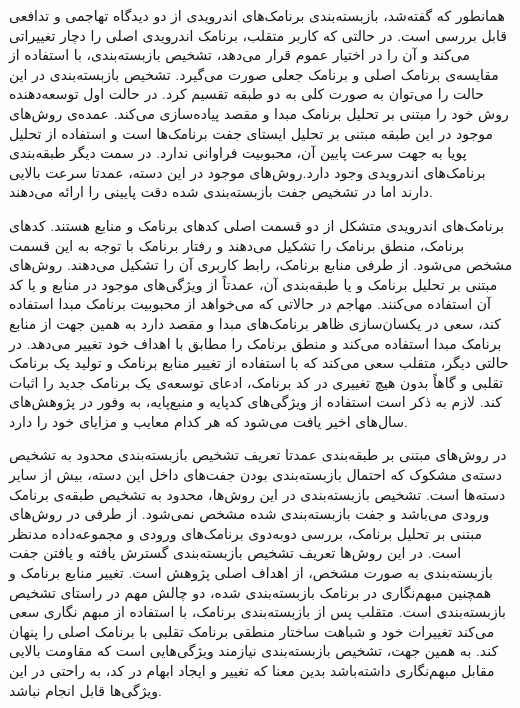 همانطور که گفته‌شد، بازبسته‌بندی برنامک‌های اندرویدی از دو دیدگاه تهاجمی و تدافعی قابل بررسی است. در حالتی که کاربر متقلب، برنامک اندرویدی اصلی را دچار تغییراتی می‌کند و آن را در اختیار عموم قرار می‌دهد،  تشخیص بازبسته‌بندی، با استفاده از مقایسه‌ی برنامک اصلی و برنامک جعلی صورت می‌گیرد. تشخیص بازبسته‌بندی در این حالت را می‌توان به صورت کلی  به دو طبقه تقسیم کرد. در حالت اول توسعه‌دهنده روش خود را مبتنی بر تحلیل برنامک مبدا و مقصد پیاده‌سازی می‌کند. عمده‌ی روش‌های موجود در این طبقه مبتنی بر تحلیل ایستا‌ی جفت‌ برنامک‌ها است و استفاده از تحلیل پویا به جهت سرعت پایین آن، محبوبیت فراوانی ندارد. در سمت دیگر طبقه‌بندی برنامک‌های اندرویدی وجود دارد.روش‌های موجود در این دسته، عمدتا سرعت بالایی دارند اما در تشخیص جفت بازبسته‌بندی شده دقت پایینی را ارائه می‌دهند.

برنامک‌های اندرویدی متشکل از دو قسمت اصلی کد‌های برنامک و منابع هستند. کد‌های برنامک، منطق برنامک را تشکیل می‌دهند و رفتار برنامک با توجه به این قسمت مشخص  می‌شود. از طرفی منابع برنامک، رابط کاربری آن را تشکیل می‌دهند. روش‌های مبتنی بر تحلیل برنامک و یا طبقه‌بندی آن، عمدتاً از ویژگی‌های موجود در منابع و یا کد آن استفاده می‌کنند. مهاجم در حالاتی که می‌خواهد از محبوبیت برنامک مبدا استفاده کند، سعی در یکسان‌سازی ظاهر برنامک‌های مبدا و مقصد دارد به همین جهت از منابع برنامک مبدا استفاده می‌کند و منطق برنامک را مطابق با اهداف خود تغییر می‌دهد. در حالتی دیگر، متقلب سعی می‌کند که با استفاده از تغییر منابع برنامک و تولید یک برنامک تقلبی و گاهاً بدون هیچ تغییری در کد برنامک، ادعای توسعه‌ی یک برنامک جدید را اثبات کند. لازم به ذکر است استفاده از ویژگی‌های کد‌پایه و منبع‌پایه، به وفور در پژوهش‌های سال‌های اخیر یافت می‌شود که هر کدام معایب و مزایای خود را دارد.

در روش‌های مبتنی بر طبقه‌بندی عمدتا تعریف تشخیص بازبسته‌بندی محدود به تشخیص دسته‌ی مشکوک که احتمال بازبسته‌بندی بودن جفت‌های داخل این دسته‌، بیش از سایر دسته‌ها است. تشخیص بازبسته‌بندی در این روش‌ها، محدود به تشخیص طبقه‌ی برنامک‌ ورودی می‌باشد و جفت بازبسته‌بندی شده مشخص نمی‌شود. از طرفی در روش‌های مبتنی بر تحلیل برنامک، بررسی دوبه‌دوی برنامک‌های ورودی و مجموعه‌داده مدنظر است. در این روش‌ها تعریف تشخیص بازبسته‌بندی گسترش یافته و یافتن جفت بازبسته‌بندی به صورت مشخص، از اهداف اصلی پژوهش است.
تغییر منابع برنامک‌ و همچنین مبهم‌نگاری در برنامک بازبسته‌بندی شده، دو چالش مهم در راستای تشخیص بازبسته‌بندی است. متقلب پس از بازبسته‌بندی برنامک، با استفاده از مبهم نگاری سعی می‌کند تغییرات خود و شباهت ساختار منطقی برنامک تقلبی با برنامک اصلی را پنهان کند. به همین جهت، تشخیص بازبسته‌بندی نیازمند ویژگی‌هایی است که مقاومت بالایی مقابل مبهم‌نگاری داشته‌باشد بدین معنا که تغییر و ایجاد ابهام در کد، به راحتی در این ویژگی‌ها قابل انجام نباشد.


